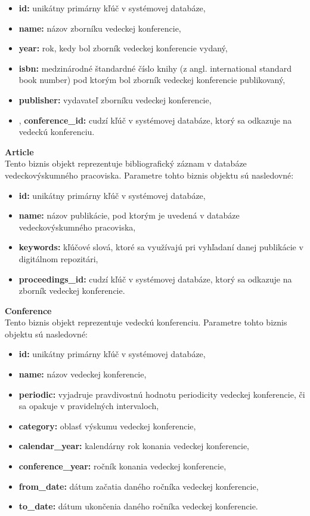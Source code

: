 \documentclass[10pt,oneside,slovak,a4paper]{article}
\begin{document}
\begin{itemize}
\item \textbf{id:} unikátny primárny kľúč v systémovej databáze,
\item \textbf{name:} názov zborníku vedeckej konferencie,
\item \textbf{year:} rok, kedy bol zborník vedeckej konferencie vydaný,
\item \textbf{isbn:} medzinárodné štandardné číslo knihy (z angl. international standard book number) pod ktorým bol zborník vedeckej konferencie publikovaný,
\item \textbf{publisher:} vydavateľ zborníku vedeckej konferencie,
\item, \textbf{conference\_id:} cudzí kľúč v systémovej databáze, ktorý sa odkazuje na vedeckú konferenciu.
\end{itemize}

\textbf{Article}\\
Tento biznis objekt reprezentuje bibliografický záznam v databáze vedeckovýskumného pracoviska. Parametre tohto biznis objektu sú nasledovné:

\begin{itemize}
\item \textbf{id:} unikátny primárny kľúč v systémovej databáze,
\item \textbf{name:} názov publikácie, pod ktorým je uvedená v databáze vedeckovýskumného pracoviska,
\item \textbf{keywords:} kľúčové slová, ktoré sa využívajú pri vyhľadaní danej publikácie v digitálnom repozitári,
\item \textbf{proceedings\_id:} cudzí kľúč v systémovej databáze, ktorý sa odkazuje na zborník vedeckej konferencie.
\end{itemize}

\textbf{Conference}\\
Tento biznis objekt reprezentuje vedeckú konferenciu. Parametre tohto biznis objektu sú nasledovné:

\begin{itemize}
\item \textbf{id:} unikátny primárny kľúč v systémovej databáze,
\item \textbf{name:} názov vedeckej konferencie,
\item \textbf{periodic:} vyjadruje pravdivostnú hodnotu periodicity vedeckej konferencie, či sa opakuje v pravidelných intervaloch,
\item \textbf{category:} oblasť výskumu vedeckej konferencie,
\item \textbf{calendar\_year:} kalendárny rok konania vedeckej konferencie,
\item \textbf{conference\_year:} ročník konania vedeckej konferencie,
\item \textbf{from\_date:} dátum začatia daného ročníka vedeckej konferencie,
\item \textbf{to\_date:} dátum ukončenia daného ročníka vedeckej konferencie.
\end{itemize}
\end{document}
